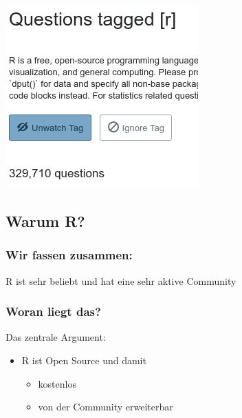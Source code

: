 \documentclass[
]{book}
\providecommand{\tightlist}{%
  \setlength{\itemsep}{0pt}\setlength{\parskip}{0pt}}
\begin{document}
\begin{center}\includegraphics[width=0.8\linewidth]{imgs/so_r} \end{center}

\hypertarget{warum-r-1}{%
\subsection{Warum R?}\label{warum-r-1}}

\hypertarget{wir-fassen-zusammen}{%
\subsubsection{Wir fassen zusammen:}\label{wir-fassen-zusammen}}

R ist sehr beliebt und hat eine sehr aktive Community

\hypertarget{woran-liegt-das}{%
\subsubsection{Woran liegt das?}\label{woran-liegt-das}}

Das zentrale Argument:

\begin{itemize}
\tightlist
\item
  R ist Open Source und damit

  \begin{itemize}
  \tightlist
  \item
    kostenlos
  \item
    von der Community erweiterbar
  \end{itemize}
\end{itemize}
\end{document}
